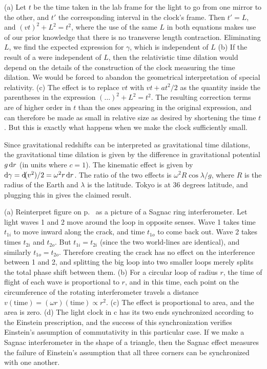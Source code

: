 

(a) Let $t$ be the time taken in the lab frame for the light to go from one mirror to the other,
and $t'$ the corresponding interval in the clock's frame. Then $t'=L$, and $(vt)^2+L^2=t^2$,
where the use of the same $L$ in both equations makes use of our prior knowledge that there
is no transverse length contraction.
Eliminating $L$, we find the expected expression for $\gamma$, which is independent of $L$
(b) If the result of a were independent of $L$, then the relativistic time dilation would depend
on the details of the construction of the clock measuring the time dilation. We would be forced
to abandon the geometrical interpretation of special relativity.
(c) The effect is to replace $vt$ with $vt+at^2/2$ as the quantity inside the parentheses
in the expression $(\ldots)^2+L^2=t^2$. The resulting correction terms are of higher order in
$t$ than the ones appearing in the original expression, and can therefore be made as small
in relative size as desired by shortening the time $t$. But this is exactly what happens when
we make the clock sufficiently small.


Since gravitational redshifts can be interpreted as gravitational time dilations, the gravitational
time dilation is given by the difference in gravitational potential $g\operatorname{d\!} r$ (in units where $c=1$).
The kinematic effect is given by $\operatorname{d\!}\gamma=\operatorname{d\!}(v^2)/2=\omega^2 r \operatorname{d\!} r$. The ratio of the
two effects is $\omega^2 R \cos\lambda/g$, where $R$ is the radius of the Earth and $\lambda$ is the
latitude. Tokyo is at 36 degrees latitude, and plugging this in gives the claimed result.


(a) Reinterpret figure  on p.~\pageref{fig:thomas-as-area} as a picture of a Sagnac
ring interferometer. Let light waves 1 and 2 move around the loop in opposite senses. Wave 1 takes time
$t_{1i}$ to move inward along the crack, and time $t_{1o}$ to come back out. Wave 2 takes times
$t_{2i}$ and $t_{2o}$. But $t_{1i}=t_{2i}$ (since the two world-lines are identical), and similarly
$t_{1o}=t_{2o}$. Therefore creating the crack has no effect on the interference between 1 and 2,
and splitting the big loop into two smaller loops merely splits the total phase shift between them.
(b) For a circular loop of radius $r$, the time of flight of each wave is proportional to $r$, and
in this time, each point on the circumference of the rotating interferometer travels a distance
$v(\text{time})=(\omega r)(\text{time})\propto r^2$. (c) The effect is proportional to area, and
the area is zero. (d) The light clock in c has its two ends synchronized according to the Einstein
prescription, and the success of this synchronization verifies Einstein's assumption of commutativity
in this particular case. If we make a Sagnac interferometer in the shape of a triangle, then the Sagnac
effect measures the failure of Einstein's assumption that all three corners can be synchronized
with one another.

